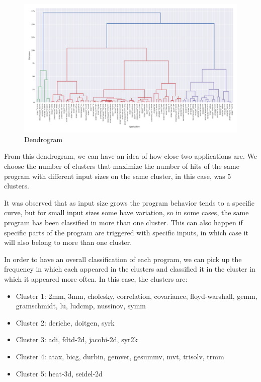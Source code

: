 
\begin{figure}[h]
	\centering
	\includegraphics[width=\textwidth]{fingerprint/figures/dendograma_input_size.png}
	\caption{Dendrogram}
	\label{fig:dendograma_input_size}
\end{figure}

From this dendrogram, we can have an idea of how close two applications are. We choose the number of clusters that maximize the number of hits of the same program with different input sizes on the same cluster, in this case, was 5 clusters.

It was observed that as input size grows the program behavior tends to a specific curve, but for small input sizes some have variation, so in some cases, the same program has been classified in more than one cluster. This can also happen if specific parts of the program are triggered with specific inputs, in which case it will also belong to more than one cluster.

In order to have an overall classification of each program, we can pick up the frequency in which each appeared in the clusters and classified it in the cluster in which it appeared more often. In this case, the clusters are:

\begin{itemize}
	\item Cluster 1: 2mm, 3mm, cholesky, correlation, covariance, floyd-warshall, gemm, gramschmidt, lu, ludcmp, nussinov, symm
	
	\item Cluster 2: deriche, doitgen, syrk
	
	\item Cluster 3: adi, fdtd-2d, jacobi-2d, syr2k
	
	\item Cluster 4: atax, bicg, durbin, gemver, gesummv, mvt, trisolv, trmm
	
	\item Cluster 5: heat-3d, seidel-2d
\end{itemize}

